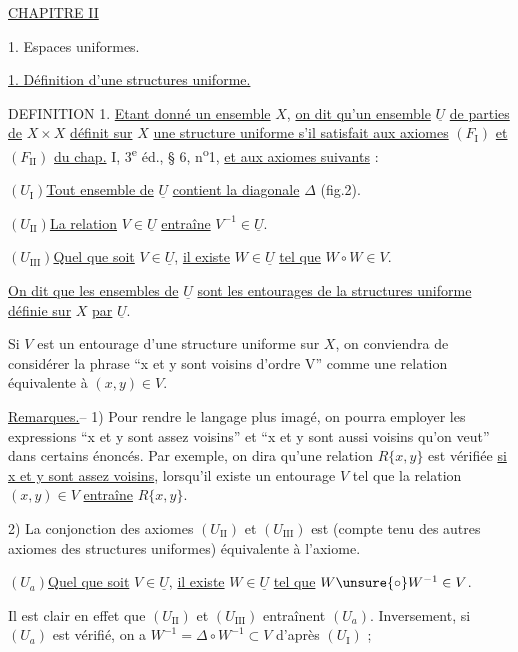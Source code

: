 \uline{CHAPITRE II}


1. Espaces uniformes.

\uline{1. Définition d'une structures uniforme.}

DEFINITION 1. \uline{Etant donné un ensemble} $X$, \uline{on dit qu'un ensemble} $\underline U$ \uline{de parties de}
$X\times X$ \uline{définit sur} $X$ \uline{une structure uniforme s'il satisfait aux axiomes}
$(F_{\mathrm I})$ \uline{et} $(F_{\mathrm{II}})$ \uline{du chap.} I, 3\textsuperscript{e} éd., § 6, n\textsuperscript{o}1, \uline{et aux axiomes suivants} :

$(U_{\mathrm I})$\quad \uline{Tout ensemble de} $\underline U$ \uline{contient la diagonale} $\Delta$ (fig.2).

$(U_{\mathrm{II}})$\quad \uline{La relation} $V\in\underline U$ \uline{entraîne} $V^{-1}\in\underline U$.

$(U_{\mathrm{III}})$\quad \uline{Quel que soit} $V\in\underline U$, \uline{il existe} $W\in\underline U$ \uline{tel que} $W\circ W\in V$.

\uline{On dit que les ensembles de} $\underline U$ \uline{sont les entourages de la structures uniforme définie sur} $X$ \uline{par} $\underline U$.

Si $V$ est un entourage d'une structure uniforme sur $X$, on conviendra de
considérer la phrase ``x et y sont voisins d'ordre V'' comme une relation équivalente à $(x,y)\in V$.

\uline{Remarques.}-- 1) Pour rendre le langage plus imagé, on pourra employer
les expressions ``x et y sont assez voisins'' et ``x et y sont aussi
voisins qu'on veut'' dans certains énoncés. Par exemple, on dira
qu'une relation $R\{x,y\}$ est vérifiée \uline{si x et y sont assez voisins},
lorsqu'il existe un entourage $V$ tel que la relation $(x,y)\in V$ \uline{entraîne} $R\{x,y\}$.

2) La conjonction des axiomes $(U_{\mathrm{II}})$ et $(U_{\mathrm{III}})$ est (compte tenu des autres axiomes des structures uniformes) équivalente à l'axiome.

$(U_a)$\quad \uline{Quel que soit} $V\in\underline U$, \uline{il existe} $W\in\underline U$ \uline{tel que} $W\unsure{\circ}W^{-1}\in V$.

Il est clair en effet que $(U_{\mathrm{II}})$ et $(U_{\mathrm{III}})$ entraînent $(U_a)$. Inversement, si $(U_a)$ est vérifié, on a $W^{-1}=\Delta\circ W^{-1}\subset V$ d'après $(U_{\mathrm I})$ ;
